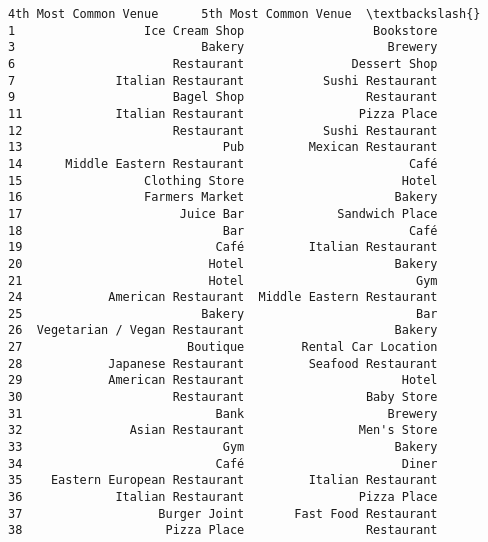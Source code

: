 \documentclass[11pt]{article}
\begin{document}
\begin{tcolorbox}[breakable, size=fbox, boxrule=.5pt, pad at break*=1mm, opacityfill=0]
\begin{Verbatim}[commandchars=\\\{\}]
            4th Most Common Venue      5th Most Common Venue  \textbackslash{}
1                  Ice Cream Shop                  Bookstore
3                          Bakery                    Brewery
6                      Restaurant               Dessert Shop
7              Italian Restaurant           Sushi Restaurant
9                      Bagel Shop                 Restaurant
11             Italian Restaurant                Pizza Place
12                     Restaurant           Sushi Restaurant
13                            Pub         Mexican Restaurant
14      Middle Eastern Restaurant                       Café
15                 Clothing Store                      Hotel
16                 Farmers Market                     Bakery
17                      Juice Bar             Sandwich Place
18                            Bar                       Café
19                           Café         Italian Restaurant
20                          Hotel                     Bakery
21                          Hotel                        Gym
24            American Restaurant  Middle Eastern Restaurant
25                         Bakery                        Bar
26  Vegetarian / Vegan Restaurant                     Bakery
27                       Boutique        Rental Car Location
28            Japanese Restaurant         Seafood Restaurant
29            American Restaurant                      Hotel
30                     Restaurant                 Baby Store
31                           Bank                    Brewery
32               Asian Restaurant                Men's Store
33                            Gym                     Bakery
34                           Café                      Diner
35    Eastern European Restaurant         Italian Restaurant
36             Italian Restaurant                Pizza Place
37                   Burger Joint       Fast Food Restaurant
38                    Pizza Place                 Restaurant


\end{Verbatim}
\end{tcolorbox}
\end{document}
